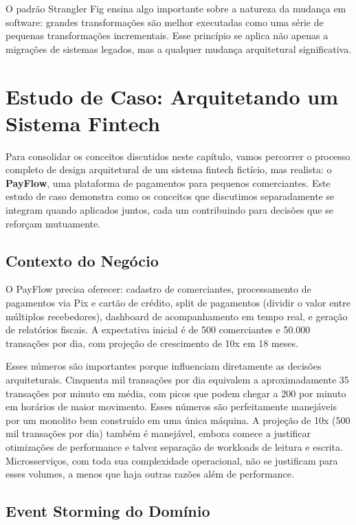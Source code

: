 O padrão Strangler Fig ensina algo importante sobre a natureza da mudança
em software: grandes transformações são melhor executadas como uma série de
pequenas transformações incrementais. Esse princípio se aplica não apenas a
migrações de sistemas legados, mas a qualquer mudança arquitetural
significativa.


\section{Estudo de Caso: Arquitetando um Sistema Fintech}

Para consolidar os conceitos discutidos neste capítulo, vamos percorrer o processo
completo de design arquitetural de um sistema fintech fictício, mas realista: o
\textbf{PayFlow}, uma plataforma de pagamentos para pequenos comerciantes. Este
estudo de caso demonstra como os conceitos que discutimos separadamente se integram
quando aplicados juntos, cada um contribuindo para decisões que se reforçam mutuamente.

\subsection{Contexto do Negócio}

O PayFlow precisa oferecer: cadastro de comerciantes, processamento de
pagamentos via Pix e cartão de crédito, split de pagamentos (dividir o valor
entre múltiplos recebedores), dashboard de acompanhamento em tempo real, e
geração de relatórios fiscais. A expectativa inicial é de 500 comerciantes
e 50.000 transações por dia, com projeção de crescimento de 10x em 18 meses.

Esses números são importantes porque influenciam diretamente as decisões
arquiteturais. Cinquenta mil transações por dia equivalem a aproximadamente
35 transações por minuto em média, com picos que podem chegar a 200 por
minuto em horários de maior movimento. Esses números são perfeitamente
manejáveis por um monolito bem construído em uma única máquina. A projeção de
10x (500 mil transações por dia) também é manejável, embora comece a
justificar otimizações de performance e talvez separação de workloads de
leitura e escrita. Microsserviços, com toda sua complexidade operacional,
não se justificam para esses volumes, a menos que haja outras razões
além de performance.

\subsection{Event Storming do Domínio}

